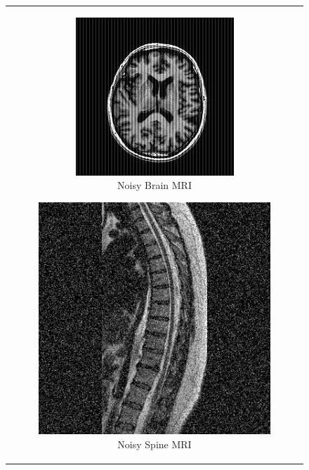 \documentclass[hidelinks,12pt]{article}
\begin{document}
	\begin{figure}[!h]
		\centering
		\begin{tabular}{c}
			\begin{subfigure}[h]{0.3\textwidth}
				\centering
				\includegraphics[width=\textwidth]{figures/brain_mri/noisy.jpg}
				\caption{Noisy Brain MRI}
			\end{subfigure}
			\hfill
			\begin{subfigure}[h]{0.3\textwidth}
				\centering
				\includegraphics[width=\textwidth]{figures/spine_mri/noisy.jpg}
				\caption{Noisy Spine MRI}
			\end{subfigure}
		\end{tabular}
		\caption{}
	\end{figure}
	
\end{document}
